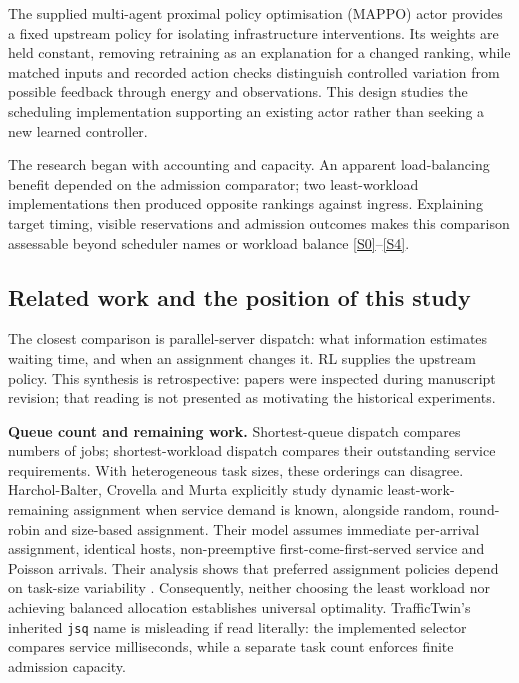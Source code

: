 \documentclass[11pt,a4paper]{article}
\begin{document}
The supplied multi-agent proximal policy optimisation (MAPPO) actor provides a fixed upstream policy for isolating infrastructure interventions. Its weights are held constant, removing retraining as an explanation for a changed ranking, while matched inputs and recorded action checks distinguish controlled variation from possible feedback through energy and observations. This design studies the scheduling implementation supporting an existing actor rather than seeking a new learned controller.

The research began with accounting and capacity. An apparent load-balancing benefit depended on the admission comparator; two least-workload implementations then produced opposite rankings against ingress. Explaining target timing, visible reservations and admission outcomes makes this comparison assessable beyond scheduler names or workload balance \hyperref[source-s0]{[S0]}--\hyperref[source-s4]{[S4]}.

\subsection{Related work and the position of this study}\label{sec:1.2}

The closest comparison is parallel-server dispatch: what information estimates waiting time, and when an assignment changes it. RL supplies the upstream policy. This synthesis is retrospective: papers were inspected during manuscript revision; that reading is not presented as motivating the historical experiments.

\textbf{Queue count and remaining work.} Shortest-queue dispatch compares numbers of jobs; shortest-workload dispatch compares their outstanding service requirements. With heterogeneous task sizes, these orderings can disagree. Harchol-Balter, Crovella and Murta explicitly study dynamic least-work-remaining assignment when service demand is known, alongside random, round-robin and size-based assignment. Their model assumes immediate per-arrival assignment, identical hosts, non-preemptive first-come-first-served service and Poisson arrivals. Their analysis shows that preferred assignment policies depend on task-size variability \cite{ref2}. Consequently, neither choosing the least workload nor achieving balanced allocation establishes universal optimality. TrafficTwin's inherited \texttt{jsq} name is misleading if read literally: the implemented selector compares service milliseconds, while a separate task count enforces finite admission capacity.
\end{document}
